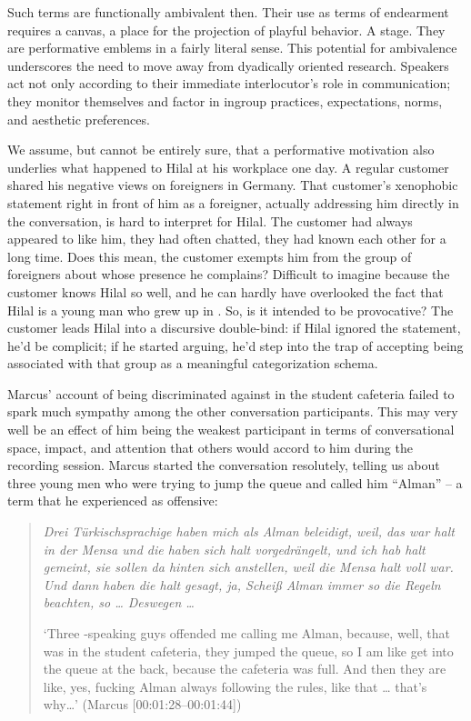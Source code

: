 \documentclass[output=paper,colorlinks,citecolor=brown]{langscibook}
\begin{document}
Such terms are functionally ambivalent then. Their use as terms of endearment requires a canvas, a place for the projection of playful behavior. A stage. They are performative emblems in a fairly literal sense. This potential for ambivalence underscores the need to move away from dyadically oriented research. Speakers act not only according to their immediate interlocutor's role in communication; they monitor themselves and factor in ingroup practices, expectations, norms, and aesthetic preferences.

We assume, but cannot be entirely sure, that a performative motivation also underlies what happened to Hilal at his workplace one day. A regular customer shared his negative views on foreigners in Germany. That customer's xenophobic statement right in front of him as a foreigner, actually addressing him directly in the conversation, is hard to interpret for Hilal. The customer had always appeared to like him, they had often chatted, they had known each other for a long time. Does this mean, the customer exempts him from the group of foreigners about whose presence he complains? Difficult to imagine because the customer knows Hilal so well, and he can hardly have overlooked the fact that Hilal is a young man who grew up in . So, is it intended to be provocative? The customer leads Hilal into a discursive double-bind: if Hilal ignored the statement, he'd be complicit; if he started arguing, he'd step into the trap of accepting being associated with that group as a meaningful categorization schema. 

Marcus' account of being discriminated against in the student cafeteria failed to spark much sympathy among the other conversation participants. This may very well be an effect of him being the weakest participant in terms of conversational space, impact, and attention that others would accord to him during the recording session. Marcus started the conversation resolutely, telling us about three young men who were trying to jump the queue and called him ``Alman'' -- a term that he experienced as offensive: 
\begin{quote}
\textit{Drei Türkischsprachige haben mich als Alman beleidigt, weil, das war halt in der Mensa und die haben sich halt vorgedrängelt, und ich hab halt gemeint, sie sollen da hinten sich anstellen, weil die Mensa halt voll war. Und dann haben die halt gesagt, ja, Scheiß Alman immer so die Regeln beachten, so … Deswegen …}

`Three -speaking guys offended me calling me Alman, because, well, that was in the student cafeteria, they jumped the queue, so I am like get into the queue at the back, because the cafeteria was full. And then they are like, yes, fucking Alman always following the rules, like that … that's why…' (Marcus [00:01:28--00:01:44]) 
\end{quote}
\end{document}
